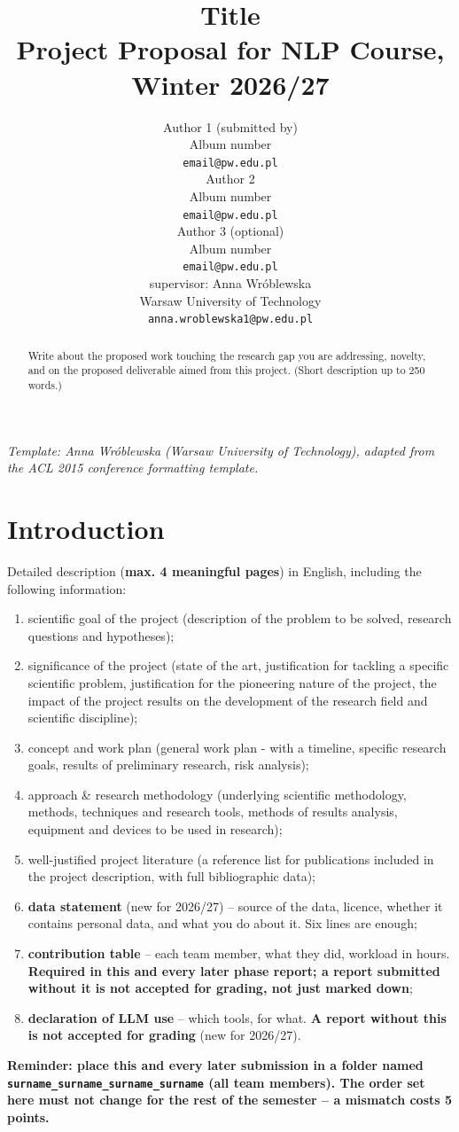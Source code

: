 \documentclass[11pt]{article}
\title{Title\\Project Proposal for NLP Course, Winter 2026/27}
\author{Author 1 (submitted by) \\
  Album number \\
  {\tt email@pw.edu.pl} \\\And
  Author 2 \\
  Album number \\
  {\tt email@pw.edu.pl} \\ \And
  Author 3 (optional) \\
  Album number \\
  {\tt email@pw.edu.pl} \\ \AND
  supervisor: Anna Wróblewska\\
  Warsaw University of Technology \\
  {\tt anna.wroblewska1@pw.edu.pl}}
\date{}
\begin{document}
\maketitle

{\small\em Template: Anna Wróblewska (Warsaw University of Technology), adapted from the ACL 2015 conference formatting template.}
\vspace{4pt}

\begin{abstract}
  Write about the proposed work touching the research gap you are addressing, novelty, and on the proposed deliverable aimed from this project.
  (Short description up to 250 words.)
\end{abstract}

\section{Introduction}
Detailed description (\textbf{max. 4 meaningful pages}) in English, including the following information:
\begin{enumerate}
\item scientific goal of the project (description of the problem to be solved, research questions and hypotheses);
\item significance of the project (state of the art, justification for tackling a specific scientific problem, justification for the pioneering nature of the project, the impact of the project results on the development of the research field and scientific discipline);
\item concept and work plan (general work plan - with a timeline, specific research goals, results of preliminary research, risk analysis);
\item approach \& research methodology (underlying scientific methodology, methods, techniques and research tools, methods of results analysis, equipment and devices to be used in research);
\item well-justified project literature (a reference list for publications included in the project description, with full bibliographic data);
\item \textbf{data statement} (new for 2026/27) -- source of the data, licence, whether it contains personal data, and what you do about it. Six lines are enough;
\item \textbf{contribution table} -- each team member, what they did, workload in hours. \textbf{Required in this and every later phase report; a report submitted without it is not accepted for grading, not just marked down};
\item \textbf{declaration of LLM use} -- which tools, for what. \textbf{A report without this is not accepted for grading} (new for 2026/27).
\end{enumerate}

\textbf{Reminder: place this and every later submission in a folder named \texttt{surname\_surname\_surname\_surname} (all team members). The order set here must not change for the rest of the semester -- a mismatch costs 5 points.}

%
%
\end{document}

